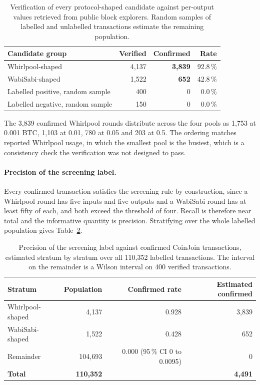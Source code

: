 \documentclass[12pt,a4paper]{article}
\begin{document}
\begin{table}[htbp]
\centering
\small
\caption{Verification of every protocol-shaped candidate against
per-output values retrieved from public block explorers. Random
samples of labelled and unlabelled transactions estimate the
remaining population.}
\label{tab:confirmed}
\begin{tabular}{lrrr}
\toprule
Candidate group & Verified & Confirmed & Rate \\
\midrule
Whirlpool-shaped                 & 4{,}137 & \textbf{3{,}839} & 92.8\,\% \\
WabiSabi-shaped                  & 1{,}522 & \textbf{652}     & 42.8\,\% \\
Labelled positive, random sample &    400  &   0              &  0.0\,\% \\
Labelled negative, random sample &    150  &   0              &  0.0\,\% \\
\bottomrule
\end{tabular}
\end{table}

The 3{,}839 confirmed Whirlpool rounds distribute across the four
pools as 1{,}753 at 0.001 BTC, 1{,}103 at 0.01, 780 at 0.05 and
203 at 0.5. The ordering matches reported Whirlpool usage, in
which the smallest pool is the busiest, which is a consistency
check the verification was not designed to pass.

\paragraph{Precision of the screening label.}
Every confirmed transaction satisfies the screening rule by
construction, since a Whirlpool round has five inputs and five
outputs and a WabiSabi round has at least fifty of each, and both
exceed the threshold of four. Recall is therefore near total and
the informative quantity is precision. Stratifying over the whole
labelled population gives Table~\ref{tab:label_precision}.

\begin{table}[htbp]
\centering
\small
\caption{Precision of the screening label against confirmed
CoinJoin transactions, estimated stratum by stratum over all
110{,}352 labelled transactions. The interval on the remainder is
a Wilson interval on 400 verified transactions.}
\label{tab:label_precision}
\begin{tabular}{lrrr}
\toprule
Stratum & Population & Confirmed rate & Estimated confirmed \\
\midrule
Whirlpool-shaped  &   4{,}137 & 0.928 & 3{,}839 \\
WabiSabi-shaped   &   1{,}522 & 0.428 &    652 \\
Remainder         & 104{,}693 & 0.000 (95\,\% CI 0 to 0.0095) &      0 \\
\midrule
\textbf{Total}    & \textbf{110{,}352} & & \textbf{4{,}491} \\
\bottomrule
\end{tabular}
\end{table}
\end{document}
